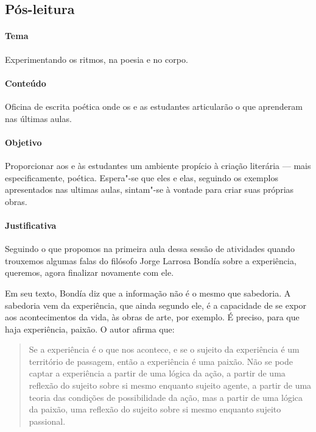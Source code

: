\documentclass[12pt]{extarticle}
\begin{document}


\subsection{Pós-leitura}



\paragraph{Tema} Experimentando os ritmos, na poesia e no corpo.

\paragraph{Conteúdo} Oficina de escrita poética onde os e as estudantes 
articularão o que aprenderam nas últimas aulas.

\paragraph{Objetivo} Proporcionar aos e às estudantes um ambiente 
propício à criação literária --- mais especificamente, poética. Espera"-se
que eles e elas, seguindo os exemplos apresentados nas ultimas aulas,
sintam"-se à vontade para criar suas próprias obras.

\paragraph{Justificativa} Seguindo o que propomos na primeira aula dessa
sessão de atividades quando trouxemos algumas falas do filósofo Jorge 
Larrosa Bondía sobre a experiência, queremos, agora finalizar novamente
com ele.

Em seu texto, Bondía diz que a informação não é o mesmo que sabedoria.
A sabedoria vem da experiência, que ainda segundo ele, é a capacidade
de se expor  aos acontecimentos da vida, às obras de arte, por exemplo.
É preciso, para que haja experiência, paixão. O autor afirma que:

\begin{quote}

Se a experiência é 
o que nos acontece, e se o sujeito da experiência é um território de passagem,
então a experiência é uma paixão. Não se pode captar
a experiência a partir de uma lógica da ação, a partir
de uma reflexão do sujeito sobre si mesmo enquanto
sujeito agente, a partir de uma teoria das condições de
possibilidade da ação, mas a partir de uma lógica da
paixão, uma reflexão do sujeito sobre si mesmo enquanto sujeito passional.

\end{quote}
\end{document}
